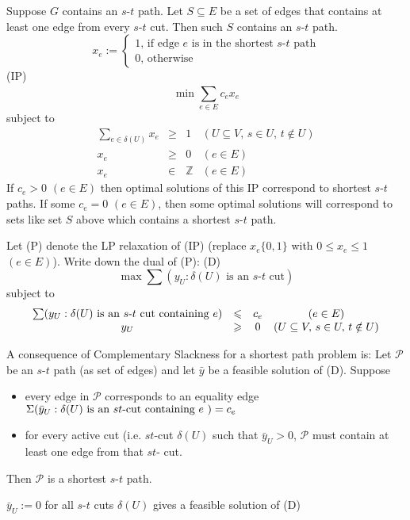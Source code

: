 Suppose $ G $ contains an $s$-$t$ path. Let $ S\subseteq E $ be a set of edges that contains
at least one edge from every $s$-$t$ cut. Then such $ S $ contains an $s$-$t$ path.
\[ x_e:=
\begin{cases}
    1,\,\text{if edge $e$ is in the shortest $s$-$t$ path}\\
    0,\,\text{otherwise}
\end{cases} \]
(IP) \[ \min \sum\limits_{e\in E}^{} c_ex_e \]
subject to
\[
\begin{array}{cccc}
    \sum\limits_{e\in\delta(U)} x_e & \geqslant  & 1 & (U\subseteq V,\,s\in U,\,t\notin U)\\
    x_e  & \geqslant  & 0 & (e\in E)\\
    x_e & \in & \mathbb{Z} & (e\in E)
\end{array}
\]
If $ c_e>0$ $(e\in E)$ then optimal solutions of this IP correspond to
shortest $s$-$t$ paths. If some $ c_e=0 $ $(e\in E)$, then some optimal solutions will
correspond to sets like set $ S $ above which contains a shortest $s$-$t$ path.

Let (P) denote the LP relaxation of (IP) (replace $ x_e \{0,1\} $ with
$ 0\leqslant x_e\leqslant 1$ $ (e\in E) $). Write down the dual of (P):
(D)
\[ \max \sum(y_U:\delta(U)\text{ is an $s$-$t$ cut})  \]
subject to
\[ 
\begin{array}{cccc}
    \sum(y_U:\delta(U)\text{ is an $s$-$t$ cut containing $ e $}) & \leqslant & c_e & (e\in E)\\
    y_U & \geqslant  & 0 & (U\subseteq V,\,s\in U,\,t\notin U)
\end{array} \]

A consequence of Complementary Slackness for a shortest path problem is:
Let $ \mathcal{P} $ be an $s$-$t$ path (as set of edges) and let
$ \bar{y} $ be a feasible solution of (D). Suppose
\begin{itemize}
    \item every edge in $ \mathcal{P} $ corresponds to an equality edge 
    $ \Sigma(\bar{y}_U:\delta(U)\text{ is an $st$-cut containing $ e $ })=c_e $
    \item for every active cut (i.e. $st$-cut $ \delta(U) $ such that
    $ \bar{y}_U>0 $, $ \mathcal{P} $ must contain at least one edge from
    that $ st $- cut.
\end{itemize}
Then $ \mathcal{P} $ is a shortest $s$-$t$ path. 

\begin{remark}
    $ \bar{y}_U:=0 $ for all $s$-$t$ cuts $ \delta(U) $ gives a feasible
    solution of (D)
\end{remark}


